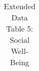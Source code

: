 \begin{longtable}{llcccccccccc}
\caption{Extended Data Table 5: Social Well-Being} \label{tab:pap__c2z} \\                                                                                                                                                                                                                                                                                                                                                                                                                                                                                                                                                                                                                                                                                                                                                                                                                                        
\hline \hline                                                                                                                                                                                                                                                                                                                                                                                                                                                                                                                                                                                                                                                                                                                                                                                                                                                                                                     

\end{longtable}
